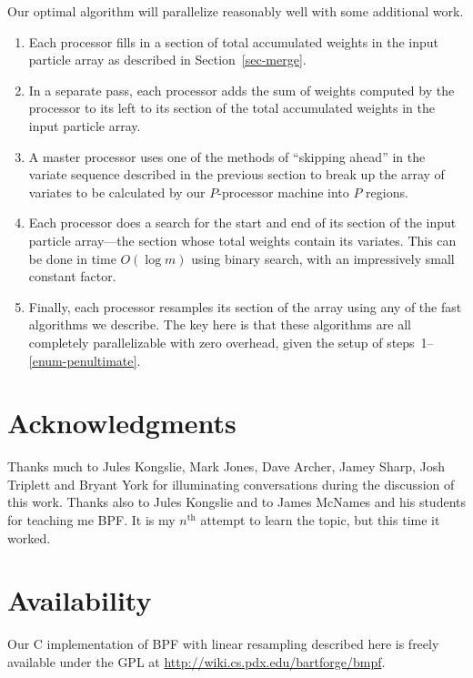 \documentclass[12pt]{article}
\begin{document}
  Our optimal algorithm will parallelize reasonably well
  with some additional work. 
  \begin{enumerate}
  \item Each processor fills in a section of total
    accumulated weights in the input particle array as
    described in Section~\ref{sec-merge}.
  \item In a separate pass, each processor adds the sum of
    weights computed by the processor to its left to its
    section of the total accumulated weights in the input
    particle array.
  \item A master processor uses one of the methods of
    ``skipping ahead'' in the variate
    sequence described in the previous section to break up the
    array of variates to be calculated by our $P$-processor
    machine into $P$ regions.
  \item \label{enum-penultimate} Each processor does a search for the start and end
    of its section of the input particle array---the section
    whose total weights contain its variates.  This can be done in time
    $O(\log m)$ using binary search, with an impressively
    small constant factor.
  \item Finally, each processor resamples its section of the array
    using any of the fast algorithms we describe.  The key
    here is that these algorithms are all completely
    parallelizable with zero overhead, given the setup of
    steps~1--\ref{enum-penultimate}.
  \end{enumerate}


\section*{Acknowledgments}

  Thanks much to Jules Kongslie, Mark Jones, Dave Archer,
  Jamey Sharp, Josh Triplett and Bryant York for
  illuminating conversations during the discussion of this
  work.  Thanks also to Jules Kongslie and to James McNames
  and his students for teaching me BPF.  It is my
  $n^{\text{th}}$ attempt to learn the topic, but this
  time it worked.

\section*{Availability}

  Our C implementation of BPF with linear resampling
  described here is freely available under the GPL at
  \url{http://wiki.cs.pdx.edu/bartforge/bmpf}.



\end{document}
